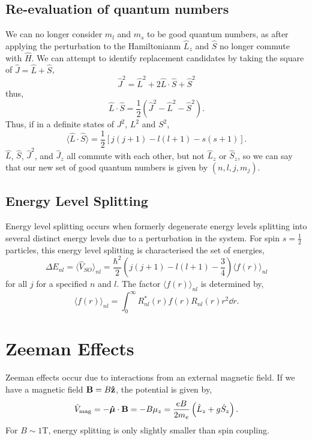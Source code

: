 \documentclass{book}
\begin{document}
\subsection{Re-evaluation of quantum numbers}
We can no longer consider $m_l$ and $m_s$ to be good quantum numbers, as after applying the perturbation to the Hamiltonianm $\hat{L}_z$ and $\hat{S}$ no longer commute with $\hat{H}$. We can attempt to identify replacement candidates by taking the square of $\hat{J} = \hat{L} + \hat{S}$,
\begin{equation}
	\hat{J}^2 = \hat{L}^2 + 2\hat{L}\cdot \hat{S} + \hat{S}^2
\end{equation}
thus,
\begin{equation}
	\hat{L}\cdot\hat{S} = \frac{1}{2}\left(\hat{J}^2 - \hat{L}^2 - \hat{S}^2\right).
\end{equation}
Thus, if in a definite states of $J^2$, $L^2$ and $S^2$,
\begin{equation}
	\langle \hat{L}\cdot\hat{S}\rangle = \frac{1}{2}\left[j(j+1) - l(l+1) - s(s+1)\right].
\end{equation}
$\hat{L}$, $\hat{S}$, $\hat{J}^2$, and $\hat{J}_z$ all commute with each other, but not $\hat{L}_z$ or $\hat{S}_z$, so we can say that our new set of good quantum numbers is given by $(n, l, j, m_j)$.
\subsection{Energy Level Splitting}
Energy level splitting occurs when formerly degenerate energy levels splitting into several distinct energy levels due to a perturbation in the system. For spin $s = \frac{1}{2}$ particles, this energy level splitting is characterised the set of energies,
\begin{equation}
	\Delta E_{nl} = \langle \hat{V}_{SO} \rangle_{nl} = \frac{\hbar^2}{2}\left(j(j+1) - l(l+1) - \frac{3}{4}\right)\langle f(r) \rangle_{nl}
\end{equation}
for all $j$ for a specified $n$ and $l$. The factor $\langle f(r) \rangle_{nl}$ is determined by,
\begin{equation}
	\langle f(r) \rangle_{nl} = \int_0^{\infty}R_{nl}^*(r)f(r)R_{nl}(r)r^2\dd{r}.
\end{equation}
\section{Zeeman Effects}
Zeeman effects occur due to interactions from an external magnetic field. If we have a magnetic field $\vb{B} = B\vu{z}$, the potential is given by,
\begin{equation}
	\hat{V}_{\text{mag}} = - \vu*{\mu}\cdot\vb{B} = - B\mu_z  = \frac{eB}{2m_e}\left(\hat{L}_z + g\hat{S}_z\right). \label{eq:vmag}
\end{equation}
For $B \sim 1$T, energy splitting is only slightly smaller than spin coupling.
\end{document}
